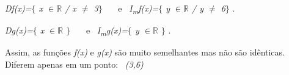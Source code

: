 \begin{texemplo}
\begin{justify}
\quad  \textit{Df(x)=$ \{ $ x $ \in \mathbb{R} $  \textbf{ }/  x $ \neq $  3$ \} $ }~~~e~  \textit{I\textsubscript{m}f(x)=$ \{ $ y $ \in \mathbb{R} $   / y $ \neq $   6$ \} $ }.
\end{justify}

\begin{justify}
\textit{\quad Dg(x)=$ \{ $ x $ \in \mathbb{R} $  $ \} $ }~~~e~  \textit{I\textsubscript{m}g(x)=$ \{ $ y $ \in \mathbb{R} $  $ \} $ }.
\end{justify}

\quad Assim, as funções \textit{f(x)} e \textit{g(x)} são muito semelhantes mas não são idênticas. Diferem apenas em um ponto:~ \textit{(3,6)}~ \qedsymbol{} 

\end{texemplo}
\newpage
